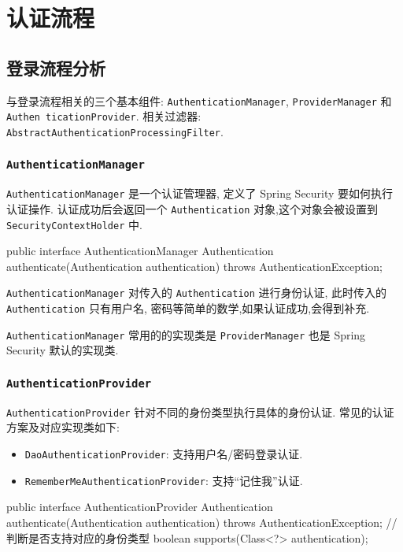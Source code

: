 \section{认证流程}

\subsection{登录流程分析}

与登录流程相关的三个基本组件: \texttt{AuthenticationManager}, \texttt{ProviderManager} 和 \texttt{Authen ticationProvider}. 相关过滤器: \texttt{AbstractAuthenticationProcessingFilter}.

\subsubsection{\texttt{AuthenticationManager}}

\texttt{AuthenticationManager} 是一个认证管理器, 定义了 Spring Security 要如何执行认证操作. 认证成功后会返回一个 \texttt{Authentication} 对象,这个对象会被设置到 \texttt{SecurityContextHolder} 中.

\begin{Java}
public interface AuthenticationManager {
    Authentication authenticate(Authentication authentication) throws AuthenticationException;
}
\end{Java}

\texttt{AuthenticationManager} 对传入的 \texttt{Authentication} 进行身份认证, 此时传入的 \texttt{Authentication} 只有用户名, 密码等简单的数学,如果认证成功,会得到补充.

\texttt{AuthenticationManager} 常用的的实现类是 \texttt{ProviderManager} 也是 Spring Security 默认的实现类.

\subsubsection{\texttt{AuthenticationProvider}}

\texttt{AuthenticationProvider} 针对不同的身份类型执行具体的身份认证. 常见的认证方案及对应实现类如下:
\begin{itemize}
  \item \texttt{DaoAuthenticationProvider}: 支持用户名/密码登录认证.
  \item \texttt{RememberMeAuthenticationProvider}: 支持``记住我''认证.
\end{itemize}

\begin{Java}
public interface AuthenticationProvider {
    Authentication authenticate(Authentication authentication) throws AuthenticationException;
    // 判断是否支持对应的身份类型
    boolean supports(Class<?> authentication);
}
\end{Java}

